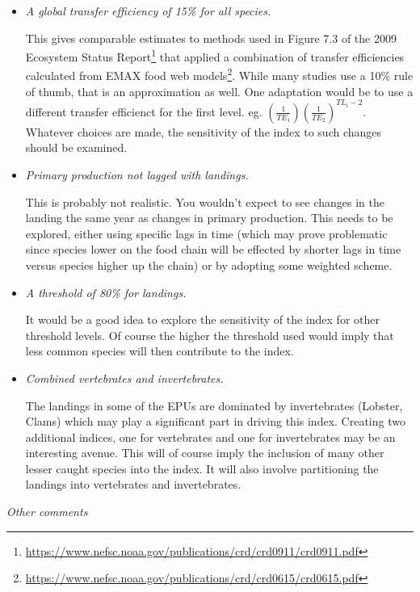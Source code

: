 \documentclass[
  10pt,
]{article}
\begin{document}
\begin{itemize}
\item
  \emph{A global transfer efficiency of 15\% for all species.}

  This gives comparable estimates to methods used in Figure 7.3 of the
  2009 Ecosystem Status Report\footnote{\url{https://www.nefsc.noaa.gov/publications/crd/crd0911/crd0911.pdf}}
  that applied a combination of transfer efficiencies calculated from
  EMAX food web models\footnote{\url{https://www.nefsc.noaa.gov/publications/crd/crd0615/crd0615.pdf}}.
  While many studies use a 10\% rule of thumb, that is an approximation
  as well. One adaptation would be to use a different transfer
  efficienct for the first level. eg.
  \(\left( \frac{1}{TE_1}\right) \left(\frac{1}{TE_2}\right)^{TL_i-2}\).
  Whatever choices are made, the sensitivity of the index to such
  changes should be examined.
\item
  \emph{Primary production not lagged with landings.}

  This is probably not realistic. You wouldn't expect to see changes in
  the landing the same year as changes in primary production. This needs
  to be explored, either using specific lags in time (which may prove
  problematic since species lower on the food chain will be effected by
  shorter lags in time versus species higher up the chain) or by
  adopting some weighted scheme.
\item
  \emph{A threshold of 80\% for landings.}

  It would be a good idea to explore the sensitivity of the index for
  other threshold levels. Of course the higher the threshold used would
  imply that less common species will then contribute to the index.
\item
  \emph{Combined vertebrates and invertebrates.}

  The landings in some of the EPUs are dominated by invertebrates
  (Lobster, Clams) which may play a significant part in driving this
  index. Creating two additional indices, one for vertebrates and one
  for invertebrates may be an interesting avenue. This will of course
  imply the inclusion of many other lesser caught species into the
  index. It will also involve partitioning the landings into vertebrates
  and invertebrates.
\end{itemize}

\emph{Other comments}
\end{document}
